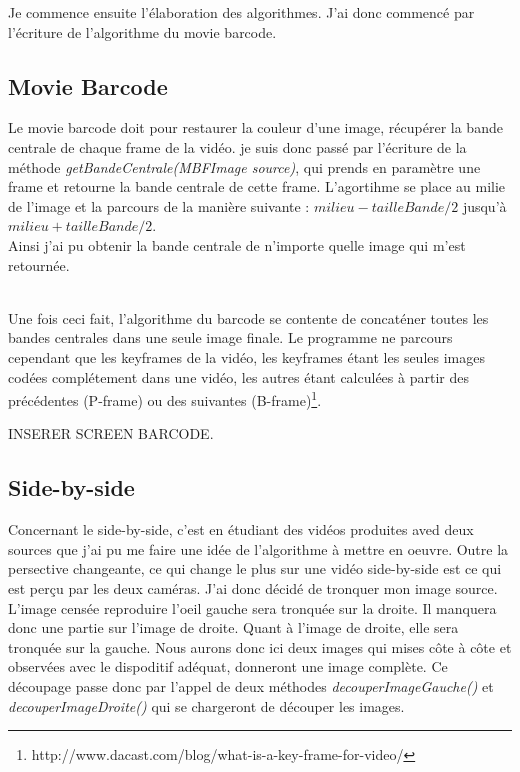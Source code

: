 \documentclass[10pt,a4paper]{article}
\begin{document}
Je commence ensuite l'élaboration des algorithmes. J'ai donc commencé par l'écriture de l'algorithme du movie barcode.
\subsection{Movie Barcode}

Le movie barcode doit pour restaurer la couleur d'une image, récupérer la bande centrale de chaque frame de la vidéo. je suis donc passé par l'écriture de la méthode \textit{getBandeCentrale(MBFImage source)},
qui prends en paramètre une frame et retourne la bande centrale de cette frame. L'agortihme se place au milie de l'image et la parcours de la manière suivante : $milieu - tailleBande /2$ jusqu'à
$milieu + tailleBande /2$.\\
Ainsi j'ai pu obtenir la bande centrale de n'importe quelle image qui m'est retournée.

~~\\

Une fois ceci fait, l'algorithme du barcode se contente de concaténer toutes les bandes centrales dans une seule image finale. Le programme ne parcours cependant que les keyframes de la vidéo,
les keyframes étant les seules images codées complétement dans une vidéo, les autres étant calculées à partir des précédentes
(P-frame) ou des suivantes (B-frame)\footnote{http://www.dacast.com/blog/what-is-a-key-frame-for-video/}.

INSERER SCREEN BARCODE.


\subsection{Side-by-side}

Concernant le side-by-side, c'est en étudiant des vidéos produites aved deux sources que j'ai pu me faire une idée de l'algorithme à mettre en oeuvre. Outre la persective changeante,
ce qui change le plus sur une vidéo side-by-side est ce qui est perçu par les deux caméras. J'ai donc décidé de tronquer mon image source. L'image censée reproduire l'oeil gauche sera tronquée sur la droite.
Il manquera donc une partie sur l'image de droite. Quant à l'image de droite, elle sera tronquée sur la gauche.  Nous aurons donc ici deux images qui mises côte à côte et observées avec le dispoditif adéquat,
donneront une image complète.
Ce découpage passe donc par l'appel de deux méthodes \textit{decouperImageGauche()} et \textit{decouperImageDroite()} qui se chargeront de découper les images.
\end{document}
